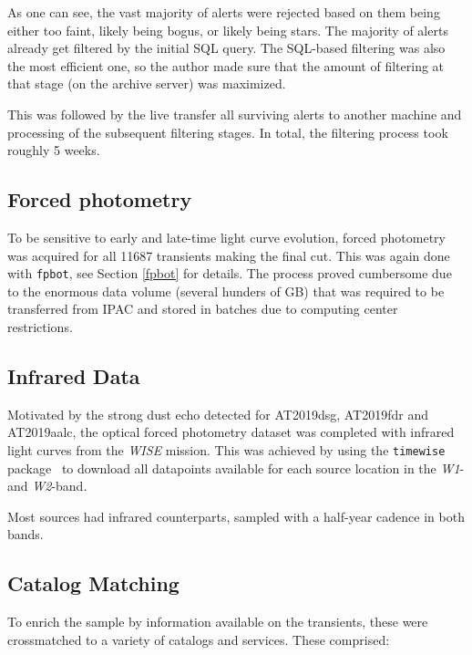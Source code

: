 As one can see, the vast majority of alerts were rejected based on them being either too faint, likely being bogus, or likely being stars. The majority of alerts already get filtered by the initial SQL query. The SQL-based filtering was also the most efficient one, so the author made sure that the amount of filtering at that stage (on the archive server) was maximized.

This was followed by the live transfer all surviving alerts to another machine and processing of the subsequent filtering stages. In total, the filtering process took roughly 5 weeks.

\subsection{Forced photometry}
To be sensitive to early and late-time light curve evolution, forced photometry was acquired for all 11687 transients making the final cut. This was again done with \texttt{fpbot}, see Section \ref{fpbot} for details. The process proved cumbersome due to the enormous data volume (several hunders of GB) that was required to be transferred from IPAC and stored in batches due to computing center restrictions.

\subsection{Infrared Data}
Motivated by the strong dust echo detected for AT2019dsg, AT2019fdr and AT2019aalc, the optical forced photometry dataset was completed with infrared light curves from the \textit{WISE} mission. This was achieved by using the \texttt{timewise} package~ to download all datapoints available for each source location in the \textit{W1}- and \textit{W2}-band.

Most sources had infrared counterparts, sampled with a half-year cadence in both bands.

\subsection{Catalog Matching}
To enrich the sample by information available on the transients, these were crossmatched to a variety of catalogs and services. These comprised:

